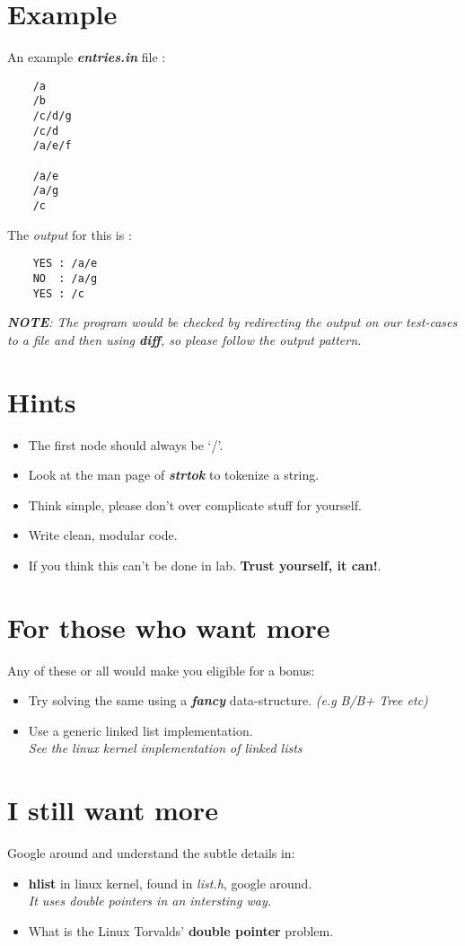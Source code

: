 \documentclass[9pt]{article}
\begin{document}
\section{Example}
An example \textit{\textbf{entries.in}} file :
\begin{verbatim}
	/a
	/b
	/c/d/g
	/c/d
	/a/e/f

	/a/e
	/a/g
	/c
\end{verbatim}
The \textit{output} for this is :
\begin{verbatim}
	YES : /a/e
	NO  : /a/g
	YES : /c
\end{verbatim}
\em{\textbf{NOTE}: The program would be checked by redirecting the output on our test-cases to a file and then using \textbf{diff}, so please follow the output pattern.} \em

\section{Hints}
\begin{itemize}
	\item The first node should always be `/'.
	\item Look at the man page of \textbf{\textit{strtok}} to tokenize a string.
	\item Think simple, please don't over complicate stuff for yourself.
	\item Write clean, modular code.
	\item If you think this can't be done in lab. \textbf{Trust yourself, it can!}.
\end{itemize}
\section{For those who want more}
Any of these or all would make you eligible for a bonus:
\begin{itemize}
	\item Try solving the same using a \textit{\textbf{fancy}} data-structure. \textit{(e.g B/B+ Tree etc)}
	\item Use a generic linked list implementation. \\
		\em{See the linux kernel implementation of linked lists} \em
\end{itemize}
\section{I still want more}
Google around and understand the subtle details in:
\begin{itemize}
	\item \textbf{hlist} in linux kernel, found in \textit{list.h}, google around. \\
		\em{It uses double pointers in an intersting way.} \em
	\item What is the Linux Torvalds' \textbf{double pointer} problem.
\end{itemize}
\end{document}

